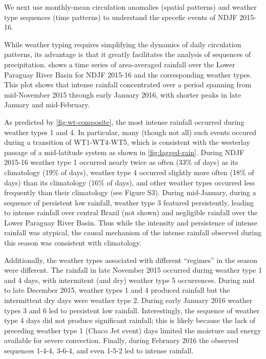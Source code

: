 \documentclass[twocol]{ametsoc}
\begin{document}
We next use monthly-mean circulation anomalies (spatial patterns) and weather type sequences (time patterns) to understand the specefic events of NDJF 2015-16.

While weather typing requires simplifying the dynamics of daily circulation patterns, its advantage is that it greatly facilitates the analysis of sequences of precipitation.
 shows a time series of area-averaged rainfall over the Lower Paraguay River Basin for NDJF 2015-16 and the corresponding weather types.
This plot shows that intense rainfall concentrated over a period spanning from mid-November 2015 through early January 2016, with shorter peaks in late January and mid-February.

As predicted by \cref{fig:wt-composite}, the most intense rainfall occurred during weather types 1 and 4.
In particular, many (though not all) such events occured during a transition of WT1-WT4-WT5, which is consistent with the westerlay passage of a mid-latitude system as shown in \cref{fig:lagged-rain}.
During NDJF 2015-16 weather type 1 occurred nearly twice as often (33\% of days) as its climatology (19\% of days), weather type 4 occurred slightly more often (18\% of days) than its climatology (16\% of days), and other weather types occurred less frequently than their climatology (see Figure S3).
During mid-January, during a sequence of persistent low rainfall, weather type 3 featured persistently, leading to intense rainfall over central Brazil (not shown) and negligible rainfall over the Lower Paraguay River Basin.
Thus while the intensity and persistence of intense rainfall was atypical, the causal mechanism of the intense rainfall observed during this season was consistent with climatology.

Additionally, the weather types associated with different ``regimes'' in the season were different.
The rainfall in late November 2015 occurred during weather type 1 and 4 days, with intermitent (and dry) weather type 5 occurrences.
During mid to late December 2015, weather types 1 and 4 produced rainfall but the intermittent dry days were weather type 2.
During early January 2016 weather types 3 and 6 led to persistent low rainfall.
Interestingly, the sequence of weather type 4 days did not produce significant rainfall; this is likely because the lack of preceding weather type 1 (Chaco Jet event) days limited the moisture and energy available for severe convection.
Finally, during February 2016 the observed sequences 1-4-4, 3-6-4, and even 1-5-2 led to intense rainfall.
\end{document}
